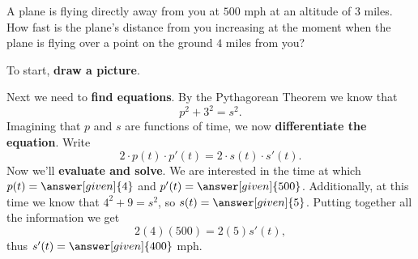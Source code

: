 \documentclass{ximera}
\begin{document}
\begin{example}
A plane is flying directly away from you at $500$ mph at an altitude
of $3$ miles.  How fast is the plane's distance from you increasing at
the moment when the plane is flying over a point on the ground $4$
miles from you?


\begin{explanation}
To start, \textbf{draw a picture}.
\begin{image}
\end{image}
Next we need to \textbf{find equations}. By the Pythagorean Theorem
we know that
\[
p^2+3^2=s^2.
\] 
Imagining that $p$ and $s$ are functions of time, we now
\textbf{differentiate the equation}. Write
\[
2\cdot p(t)\cdot p'(t)  = 2\cdot s(t) \cdot s'(t).
\] 
Now we'll \textbf{evaluate and solve}.  We
are interested in the time at which $p(t)=\answer[given]{4}$ and $p'(t) =
\answer[given]{500}$. Additionally, at this time we know that $4^2+9=s^2$, so
$s(t)=\answer[given]{5}$.  Putting together all the information we get
\[
2(4)(500)=2(5)s'(t),
\]
thus $s'(t)=\answer[given]{400}$ mph.
\end{explanation}
\end{example}
\end{document}
